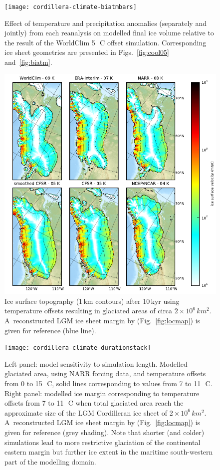 \documentclass[tc, ms]{copernicus}
\begin{document}
\begin{figure}
  \texttt{[image: cordillera-climate-biatmbars]}
  \caption{Effect of temperature and precipitation anomalies (separately and jointly) from each reanalysis on modelled final ice volume relative to the result of the WorldClim 5\,\unit{{\degree}C} offset simulation. Corresponding ice sheet geometries are presented in Figs.~\ref{fig:cool05} and~\ref{fig:biatm}.}
  \label{fig:biatmbars}
\end{figure}

\begin{figure}
  \includegraphics{cordillera-climate-best}
  \caption{Ice surface topography (1\,km contours) after 10\,kyr using temperature offsets resulting in glaciated areas of circa $2 \times 10^6\,\unit{km^2}$. A~reconstructed LGM ice sheet margin by \citet{dyke-2004} (Fig.~\ref{fig:locmap}) is given for reference (blue line).}
  \label{fig:best}
\end{figure}

\begin{figure}
  \texttt{[image: cordillera-climate-durationstack]}
  \caption{Left panel: model sensitivity to simulation length. Modelled glaciated area, using NARR forcing data, and temperature offsets from 0 to 15\,\unit{{\degree}C}, solid lines corresponding to values from 7 to 11\,\unit{{\degree}C}. Right panel: modelled ice margin corresponding to temperature offsets from 7 to 11\,\unit{{\degree}C} when total glaciated area reach the approximate size of the LGM Cordilleran ice sheet of $2 \times 10^6\,\unit{km^2}$. A~reconstructed LGM ice sheet margin by \citet{dyke-2004} (Fig.~\ref{fig:locmap}) is given for reference (grey shading). Note that shorter (and colder) simulations lead to more restrictive glaciation of the continental eastern margin but further ice extent in the maritime south-western part of the modelling domain.}
  \label{fig:durationstack}
\end{figure}

\end{document}
